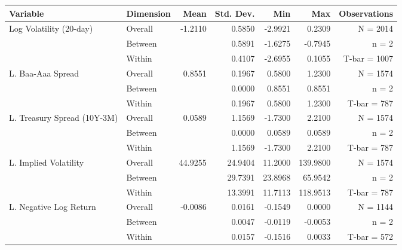 
\begin{threeparttable}
    \footnotesize %
    \setlength{\tabcolsep}{3pt} %

    \begin{tabular}{@{\extracolsep{\fill}}l l r r r r r@{\extracolsep{\fill}}}
    \toprule
    Variable                     & Dimension & Mean    & Std. Dev. & Min      & Max      & Observations \\
    \midrule
    Log Volatility (20-day)      & Overall   & -1.2110 & 0.5850    & -2.9921  &  0.2309  & N = 2014     \\
                                 & Between   &         & 0.5891    & -1.6275  & -0.7945  & n = 2        \\
                                 & Within    &         & 0.4107    & -2.6955  &  0.1055  & T-bar = 1007 \\
    \addlinespace
    L. Baa-Aaa Spread            & Overall   &  0.8551 & 0.1967    &  0.5800  &  1.2300  & N = 1574     \\
                                 & Between   &         & 0.0000    &  0.8551  &  0.8551  & n = 2        \\
                                 & Within    &         & 0.1967    &  0.5800  &  1.2300  & T-bar = 787  \\
    \addlinespace
    L. Treasury Spread (10Y-3M)  & Overall   &  0.0589 & 1.1569    & -1.7300  &  2.2100  & N = 1574     \\
                                 & Between   &         & 0.0000    &  0.0589  &  0.0589  & n = 2        \\
                                 & Within    &         & 1.1569    & -1.7300  &  2.2100  & T-bar = 787  \\
    \addlinespace
    L. Implied Volatility        & Overall   & 44.9255 & 24.9404   & 11.2000  & 139.9800 & N = 1574     \\
                                 & Between   &         & 29.7391   & 23.8968  & 65.9542  & n = 2        \\
                                 & Within    &         & 13.3991   & 11.7113  & 118.9513 & T-bar = 787  \\
    \addlinespace
    L. Negative Log Return       & Overall   & -0.0086 & 0.0161    & -0.1549  &  0.0000  & N = 1144     \\
                                 & Between   &         & 0.0047    & -0.0119  & -0.0053  & n = 2        \\
                                 & Within    &         & 0.0157    & -0.1516  &  0.0033  & T-bar = 572  \\
    \bottomrule
    \end{tabular}


\end{threeparttable}
